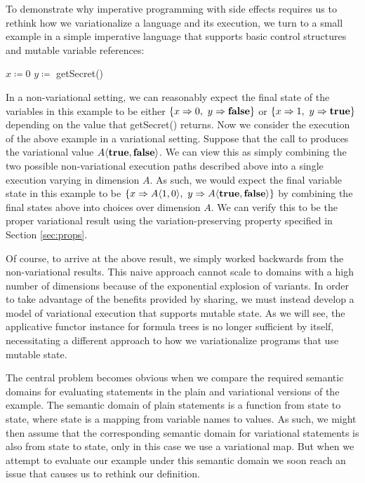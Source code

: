 \documentclass[12pt,oneside]{book}
\newcommand{\tagtree}[3]{#1 \langle #2, #3 \rangle}
\begin{document}
To demonstrate why imperative programming with side effects requires us to rethink how we
variationalize a language and its execution, we turn to a small example in a simple imperative
language that supports basic control structures and mutable variable references:

\begin{samepage}
\begin{algorithmic}
\STATE $x \coloneqq 0$
\STATE $y \coloneqq$ getSecret()
\ENDIF
\end{algorithmic}
\end{samepage}

In a non-variational setting, we can reasonably expect the final state of the variables in this example
to be either $\{x \Rightarrow 0,\ y \Rightarrow \textbf{\textup{\textrm{false}}}\}$ or
$\{x \Rightarrow 1,\ y \Rightarrow \textbf{\textup{\textrm{true}}}\}$ depending on the value that
getSecret() returns. Now we consider the execution of the above example in a variational
setting. Suppose that the call to 
produces the variational value $\tagtree{A}{\CCkeyw{true}}{\CCkeyw{false}}$. We can view this as simply
combining the two possible non-variational execution paths described above into a
single execution varying in dimension $A$. As such, we would expect the final variable state
in this example to be  $\{x \Rightarrow \tagtree{A}{1}{0},\ y \Rightarrow \tagtree{A}{\CCkeyw{true}}{\CCkeyw{false}}\}$ by combining the final states above into choices over dimension $A$. We can verify this to be the proper variational result using the variation-preserving property
specified in Section \ref{sec:props}.

Of course, to arrive at the above result, we simply worked backwards from the non-variational
results. This naive approach cannot scale to domains with a high number of dimensions because of the exponential
explosion of variants. In order to take advantage of the benefits provided by sharing, we must instead develop a model
of variational execution that supports mutable state.  As we will see, the applicative functor instance for
formula trees is no longer sufficient by itself, necessitating a different approach to how we variationalize programs
that use mutable state.

The central problem becomes obvious when we compare the required semantic domains for evaluating statements
in the plain and variational versions of the example. The semantic domain of plain statements is a function from state to
state, where state is a mapping from variable names to values. As such, we might then assume that the corresponding
semantic domain for variational statements is also from state to state, only in this case we use a variational map. But when
we attempt to evaluate our example under this semantic domain we soon reach an issue that causes us to rethink our definition.
\end{document}
